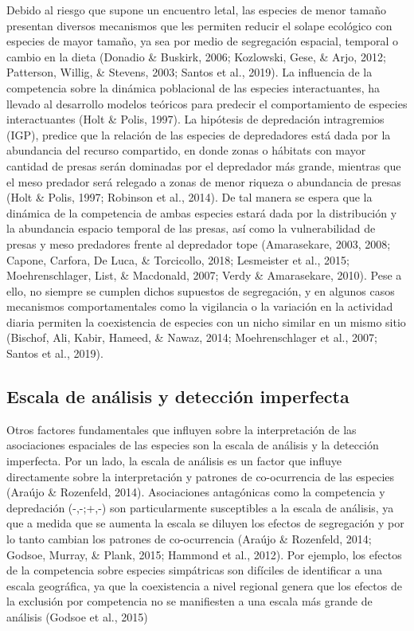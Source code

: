 \documentclass[12pt,twoside]{reedthesis}
\begin{document}
Debido al riesgo que supone un encuentro letal, las especies de menor tamaño presentan diversos mecanismos que les permiten reducir el solape ecológico con especies de mayor tamaño, ya sea por medio de segregación espacial, temporal o cambio en la dieta (Donadio \& Buskirk, 2006; Kozlowski, Gese, \& Arjo, 2012; Patterson, Willig, \& Stevens, 2003; Santos et al., 2019). La influencia de la competencia sobre la dinámica poblacional de las especies interactuantes, ha llevado al desarrollo modelos teóricos para predecir el comportamiento de especies interactuantes (Holt \& Polis, 1997). La hipótesis de depredación intragremios (IGP), predice que la relación de las especies de depredadores está dada por la abundancia del recurso compartido, en donde zonas o hábitats con mayor cantidad de presas serán dominadas por el depredador más grande, mientras que el meso predador será relegado a zonas de menor riqueza o abundancia de presas (Holt \& Polis, 1997; Robinson et al., 2014). De tal manera se espera que la dinámica de la competencia de ambas especies estará dada por la distribución y la abundancia espacio temporal de las presas, así como la vulnerabilidad de presas y meso predadores frente al depredador tope (Amarasekare, 2003, 2008; Capone, Carfora, De Luca, \& Torcicollo, 2018; Lesmeister et al., 2015; Moehrenschlager, List, \& Macdonald, 2007; Verdy \& Amarasekare, 2010). Pese a ello, no siempre se cumplen dichos supuestos de segregación, y en algunos casos mecanismos comportamentales como la vigilancia o la variación en la actividad diaria permiten la coexistencia de especies con un nicho similar en un mismo sitio (Bischof, Ali, Kabir, Hameed, \& Nawaz, 2014; Moehrenschlager et al., 2007; Santos et al., 2019).

\hypertarget{escala-de-anuxe1lisis-y-detecciuxf3n-imperfecta}{%
\subsection{Escala de análisis y detección imperfecta}\label{escala-de-anuxe1lisis-y-detecciuxf3n-imperfecta}}

Otros factores fundamentales que influyen sobre la interpretación de las asociaciones espaciales de las especies son la escala de análisis y la detección imperfecta. Por un lado, la escala de análisis es un factor que influye directamente sobre la interpretación y patrones de co-ocurrencia de las especies (Araújo \& Rozenfeld, 2014). Asociaciones antagónicas como la competencia y depredación (-,-;+,-) son particularmente susceptibles a la escala de análisis, ya que a medida que se aumenta la escala se diluyen los efectos de segregación y por lo tanto cambian los patrones de co-ocurrencia (Araújo \& Rozenfeld, 2014; Godsoe, Murray, \& Plank, 2015; Hammond et al., 2012). Por ejemplo, los efectos de la competencia sobre especies simpátricas son difíciles de identificar a una escala geográfica, ya que la coexistencia a nivel regional genera que los efectos de la exclusión por competencia no se manifiesten a una escala más grande de análisis (Godsoe et al., 2015)
\end{document}
